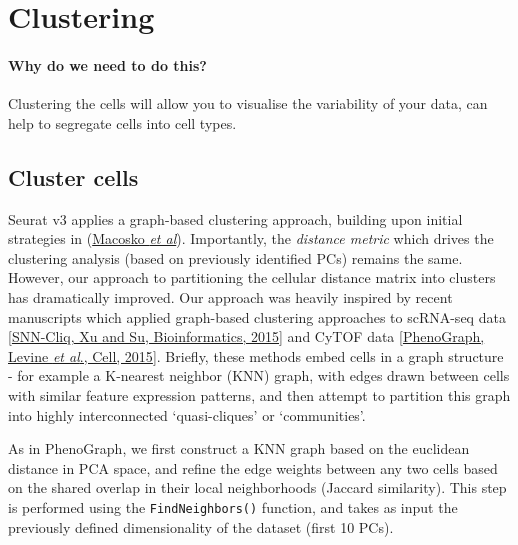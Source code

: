 \documentclass[
]{book}
\begin{document}
\hypertarget{clustering}{%
\chapter{Clustering}\label{clustering}}

\hypertarget{why-do-we-need-to-do-this-5}{%
\subsubsection*{Why do we need to do this?}\label{why-do-we-need-to-do-this-5}}

Clustering the cells will allow you to visualise the variability of your data, can help to segregate cells into cell types.

\hypertarget{section-8}{%
\subsubsection*{}\label{section-8}}

\hypertarget{cluster-cells}{%
\section{Cluster cells}\label{cluster-cells}}

Seurat v3 applies a graph-based clustering approach, building upon initial strategies in (\href{http://www.cell.com/abstract/S0092-8674(15)00549-8}{Macosko \emph{et al}}). Importantly, the \emph{distance metric} which drives the clustering analysis (based on previously identified PCs) remains the same. However, our approach to partitioning the cellular distance matrix into clusters has dramatically improved. Our approach was heavily inspired by recent manuscripts which applied graph-based clustering approaches to scRNA-seq data \href{http://bioinformatics.oxfordjournals.org/content/early/2015/02/10/bioinformatics.btv088.abstract}{{[}SNN-Cliq, Xu and Su, Bioinformatics, 2015{]}} and CyTOF data \href{http://www.ncbi.nlm.nih.gov/pubmed/26095251}{{[}PhenoGraph, Levine \emph{et al}., Cell, 2015{]}}. Briefly, these methods embed cells in a graph structure - for example a K-nearest neighbor (KNN) graph, with edges drawn between cells with similar feature expression patterns, and then attempt to partition this graph into highly interconnected `quasi-cliques' or `communities'.

As in PhenoGraph, we first construct a KNN graph based on the euclidean distance in PCA space, and refine the edge weights between any two cells based on the shared overlap in their local neighborhoods (Jaccard similarity). This step is performed using the \texttt{FindNeighbors()} function, and takes as input the previously defined dimensionality of the dataset (first 10 PCs).
\end{document}
